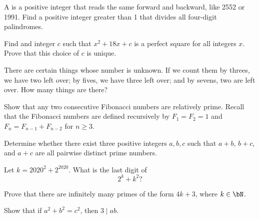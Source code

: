 \documentclass[12pt]{article}
\begin{document}
        \begin{exercise}
            A  is a positive integer that reads the same forward and backward, like 2552 or 1991. 
            Find a positive integer greater than 1 that divides all four-digit palindromes.
        \end{exercise}
    
        \begin{exercise}
            Find and integer \(c\) such that \(x^2+18x+c\) is a perfect square for all integers \(x\). 
            Prove that this choice of \(c\) is unique. 
        \end{exercise}
    
        \begin{exercise}
            There are certain things whose number is unknown. 
            If we count them by threes, we have two left over; by fives, we have three left over; and by sevens, two are left over. 
            How many things are there?
        \end{exercise}
    
        \begin{exercise}
            Show that any two consecutive Fibonacci numbers are relatively prime. 
            Recall that the Fibonacci numbers are defined recursively by \(F_1=F_2=1\) and \(F_n=F_{n-1}+F_{n-2}\) for \(n\geq 3\).
        \end{exercise}
    
        \begin{exercise}
            Determine whether there exist three positive integers \(a,b,c\) such that \(a+b\), \(b+c\), and \(a+c\) are all pairwise distinct prime numbers.
        \end{exercise}
    
        \begin{exercise}
            Let \(k=2020^2+2^{2020}\).
            What is the last digit of
            \[2^k+k^2\textrm{?}\]
        \end{exercise}
    
        \begin{exercise}
            Prove that there are infinitely many primes of the form \(4k+3\), where \(k\in\bN\).
        \end{exercise}
    
        \begin{exercise}
            Show that if \(a^2+b^2=c^2\), then \(3\mid ab\).
        \end{exercise}
    
\end{document}
